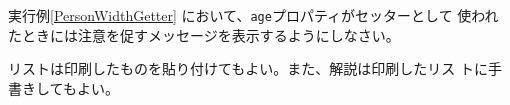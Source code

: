 \begin{Prob}\upshape
 実行例\else\ref{PersonWidthGetter}\fi
 において、\texttt{age}プロパティがセッターとして
 使われたときには注意を促すメッセージを表示するようにしなさい。
\end{Prob}
\ifText リストは印刷したものを貼り付けてもよい。また、解説は印刷したリス
トに手書きしてもよい。
\vspace{0.2\textheight}\fi
